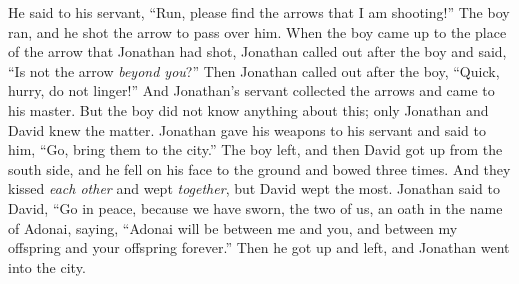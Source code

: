 \begin{biblechapter}
\verse He said to his servant, “Run, please find the arrows that I am shooting!” The boy ran, and he shot the arrow to pass over him.
\verse When the boy came up to the place of the arrow that Jonathan had shot, Jonathan called out after the boy and said, “Is not the arrow \textit{beyond you}?”
\verse Then Jonathan called out after the boy, “Quick, hurry, do not linger!” And Jonathan’s servant collected the arrows and came to his master.
\verse But the boy did not know anything about this; only Jonathan and David knew the matter.
\verse Jonathan gave his weapons to his servant and said to him, “Go, bring them to the city.”
\verse The boy left, and then David got up from the south side, and he fell on his face to the ground and bowed three times. And they kissed \textit{each other} and wept \textit{together}, but David wept the most.
\verse Jonathan said to David, “Go in peace, because we have sworn, the two of us, an oath in the name of Adonai, saying, “Adonai will be between me and you, and between my offspring and your offspring forever.” Then he got up and left, and Jonathan went into the city.
\end{biblechapter}

